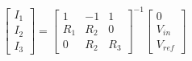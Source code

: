 \documentclass{article}
\begin{document}
\thispagestyle{empty}

$$
\begin{bmatrix}
I_1\\ I_2\\ I_3
\end{bmatrix}
=
\begin{bmatrix}
1 & -1 & 1 \\
R_{1} & R_{2} & 0 \\
0 & R_{2} & R_{3}
\end{bmatrix}^{-1}
\begin{bmatrix}
0 \\ V_{in} \\ V_{ref}
\end{bmatrix}
$$
\end{document}
